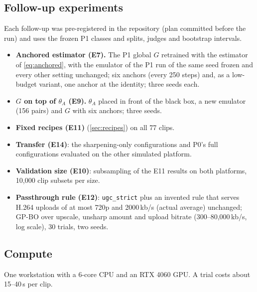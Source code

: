 \subsection{Follow-up experiments}
Each follow-up was pre-registered in the repository (plan committed before the run) and uses the
frozen P1 classes and splits, judges and bootstrap intervals.
\begin{itemize}
  \item \textbf{Anchored estimator (E7).} The P1 global $G$ retrained with the estimator of
        \cref{eq:anchored}, with the emulator of the P1 run of the same seed frozen and every other
        setting unchanged; six anchors (every 250 steps) and, as a low-budget variant, one anchor at
        the identity; three seeds each.
  \item \textbf{$G$ on top of $\theta_A$ (E9).} $\theta_A$ placed in front of the black box, a new
        emulator (156 pairs) and $G$ with six anchors; three seeds.
  \item \textbf{Fixed recipes (E11)} (\cref{sec:recipes}) on all 77 clips.
  \item \textbf{Transfer (E14)}: the sharpening-only configurations and P0's full configurations
        evaluated on the other simulated platform.
  \item \textbf{Validation size (E10)}: subsampling of the E11 results on both platforms, 10{,}000
        clip subsets per size.
  \item \textbf{Passthrough rule (E12)}: \texttt{ugc\_strict} plus an invented rule that serves
        H.264 uploads of at most 720p and 2000\,kb/s (actual average) unchanged; GP-BO over upscale,
        unsharp amount and upload bitrate (300--80{,}000\,kb/s, log scale), 30 trials, two seeds.
\end{itemize}

\subsection{Compute}
One workstation with a 6-core CPU and an RTX 4060 GPU. A trial costs about 15--40\,s per clip.
